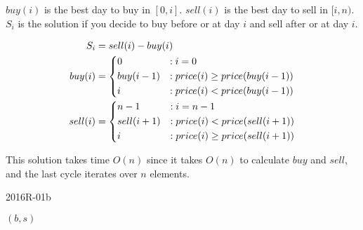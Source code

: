 {\ansseparator

$buy(i)$ is the best day to buy in $[0,i]$. $sell(i)$ is the best day to sell in $[i,n)$. $S_i$ is the solution if you decide to buy before or at day $i$ and sell after or at day $i$.

\begin{alignat*}{2}
    S_i     &= sell(i) - buy(i) \\
    buy(i)  &= \begin{dcases}
        0                          &: i=0 \\
        buy(i-1) &: price(i) \geq price(buy(i-1)) \\
        i        &: price(i) <    price(buy(i-1))
    \end{dcases} \\
    sell(i) &= \begin{dcases}
        n-1                         &: i=n-1 \\
        sell(i+1) &: price(i) <    price(sell(i+1)) \\
        i         &: price(i) \geq price(sell(i+1))
    \end{dcases}
\end{alignat*}

This solution takes time $O(n)$ since it takes $O(n)$ to calculate $buy$ and $sell$, and the last cycle iterates over $n$ elements.

\newpage
\begin{algorithm}[H]
    \caption{2016R-01b}
    \begin{algorithmic}[1]
                \EndIf
            \EndFor
                \EndIf
            \EndFor
                \EndIf
            \EndFor
            \State \Return $(b, s)$
        \EndFunction
    \end{algorithmic}
\end{algorithm}

}

